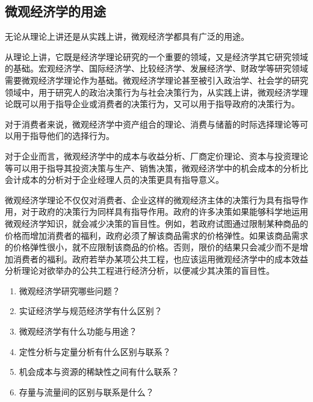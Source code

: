 \subsection{微观经济学的用途}

无论从理论上讲还是从实践上讲，微观经济学都具有广泛的用途。

从理论上讲，它既是经济学理论研究的一个重要的领域，又是经济学其它研究领域的基础。宏观经济学、国际经济学、比较经济学、发展经济学、财政学等研究领域需要微观经济学理论作为基础。微观经济学理论甚至被引入政治学、社会学的研究领域中，用于研究人的政治决策行为与社会决策行为，从实践上讲，微观经济学理论既可以用于指导企业或消费者的决策行为，又可以用于指导政府的决策行为。

对于消费者来说，微观经济学中资产组合的理论、消费与储蓄的时际选择理论等可以用于指导他们的选择行为。

对于企业而言，微观经济学中的成本与收益分析、厂商定价理论、资本与投资理论等可以用于指导其投资决策与生产、销售决策，微观经济学中的机会成本的分析比会计成本的分析对于企业经理人员的决策更具有指导意义。

微观经济学理论不仅仅对消费者、企业这样的微观经济主体的决策行为具有指导作用，对于政府的决策行为同样具有指导作用。政府的许多决策如果能够科学地运用微观经济学知识，就会减少决策的盲目性。例如，若政府试图通过限制某种商品的价格而增加消费者的福利，政府必须了解该商品需求的价格弹性。如果该商品需求的价格弹性很小，就不应限制该商品的价格。否则，限价的结果只会减少而不是增加消费者的福利。政府若举办某项公共工程，也应该运用微观经济学中的成本效益分析理论对欲举办的公共工程进行经济分析，以便减少其决策的盲目性。


\begin{enumerate}
\item 微观经济学研究哪些问题？

\item 实证经济学与规范经济学有什么区别？

\item 微观经济学有什么功能与用途？

\item 定性分析与定量分析有什么区别与联系？

\item 机会成本与资源的稀缺性之间有什么联系？

\item 存量与流量间的区别与联系是什么？
\end{enumerate}

\newpage
